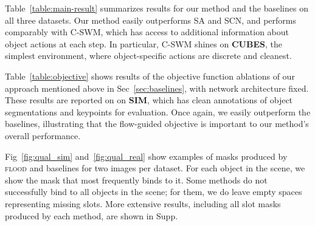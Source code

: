 \documentclass{article}
\begin{document}
Table~\ref{table:main-result} summarizes results for our method and the baselines on all three datasets. 
Our method easily outperforms SA and SCN, and performs comparably with C-SWM, which has access to additional information about object actions at each step. In particular, C-SWM  shines on \textbf{CUBES}, the simplest environment, where object-specific actions are discrete and cleanest. 

Table~\ref{table:objective} shows results of the objective function ablations of our approach mentioned above in Sec~\ref{sec:baselines}, with network architecture fixed. These results are reported on on \textbf{SIM}, which has clean annotations of object segmentations and keypoints for evaluation. 
Once again, we easily outperform the baselines, illustrating that the flow-guided objective is important to our method's overall performance. 


Fig~\ref{fig:qual_sim} and~\ref{fig:qual_real} show examples of masks produced by \textsc{flood} and baselines for two images per dataset. 
For each object in the scene, we show the mask that most frequently binds to it. 
Some methods do not successfully bind to all objects in the scene; for them, we do leave empty spaces representing missing slots.
More extensive results, including all slot masks produced by each method, are shown in Supp.
\end{document}

